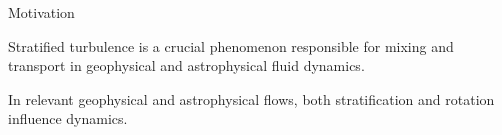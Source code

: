 \documentclass[aspecttatio=169]{beamer}
\begin{document}
\begin{frame}{Motivation}

\begin{itemize}
{\small
\item Stratified turbulence is a crucial phenomenon responsible for mixing and
transport in geophysical and astrophysical fluid dynamics. 

\item In relevant geophysical and astrophysical flows, both stratification and
rotation influence dynamics. 
} %
\end{itemize}


\end{frame}





\end{document}
